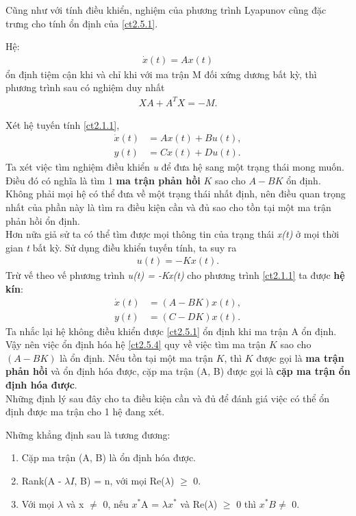 Cũng như với tính điều khiển, nghiệm của phương trình Lyapunov cũng đặc trưng cho tính ổn định của \eqref{ct2.5.1}.
\begin{theorem}
Hệ:
\begin{align*}
    \dot{x}(t) = Ax(t)
\end{align*}
ổn định tiệm cận khi và chỉ khi với ma trận M đối xứng dương bất kỳ, thì phương trình sau có nghiệm duy nhất
\begin{align*}
    XA + A^{T}X = -M.
\end{align*}
\end{theorem}
Xét hệ tuyến tính \eqref{ct2.1.1},
\begin{align*}
    \dot{x}(t) &= Ax(t) + Bu(t),\\
    y(t) &= Cx(t) + Du(t).
\end{align*}
Ta xét việc tìm nghiệm điều khiển \emph{u} để đưa hệ sang một trạng thái mong muốn. Điều đó có nghĩa là tìm 1 \textbf{ma trận phản hồi} $K$ sao cho $A - BK$ ổn định. Không phải mọi hệ có thể đưa về một trạng thái nhất định, nên điều quan trọng nhất của phần này là tìm ra điều kiện cần và đủ sao cho tồn tại một ma trận phản hồi ổn định.\\
Hơn nữa giả sử ta có thể tìm được mọi thông tin của trạng thái \emph{x(t)} ở mọi thời gian \emph{t} bất kỳ. Sử dụng điều khiển tuyến tính, ta suy ra 
\begin{align}
    u(t) = -Kx(t).
\end{align}
Trừ vế theo vế phương trình \emph{u(t) = -Kx(t)} cho phương trình \eqref{ct2.1.1} ta được \textbf{hệ kín}:
\begin{align}\label{ct2.5.4}
    \dot{x}(t) &= (A - BK)x(t),\\
    y(t) &= (C - DK)x(t).
\end{align}
Ta nhắc lại hệ không điều khiển được \eqref{ct2.5.1}
 ổn định khi ma trận A ổn định. Vậy nên việc ổn định hóa hệ \eqref{ct2.5.4} quy về việc tìm ma trận  $K$ sao cho $(A - BK)$ là ổn định. Nếu tồn tại một ma trận $K$, thì $K$ được gọi là \textbf{ma trận phản hồi} và ổn định hóa được, cặp ma trận (A, B) được gọi là \textbf{cặp ma trận ổn định hóa được}.\\
 Những định lý sau đây cho ta điều kiện cần và đủ để đánh giá việc có thể ổn định được ma trận cho 1 hệ đang xét.\\
 \begin{theorem}
  Những khẳng định sau là tương đương:
 \begin{enumerate}
     \item Cặp ma trận (A, B) là ổn định hóa được.
     \item Rank(A - $\lambda I$, B) = n, với mọi Re($\lambda$) $\geq$ 0.
     \item Với mọi $\lambda$ và x $\ne$ 0, nếu $x^{*}$A = $\lambda x^{*}$ và Re($\lambda$) $\geq$ 0 thì $x^{*}B \ne$ 0.
 \end{enumerate}
 \end{theorem}
